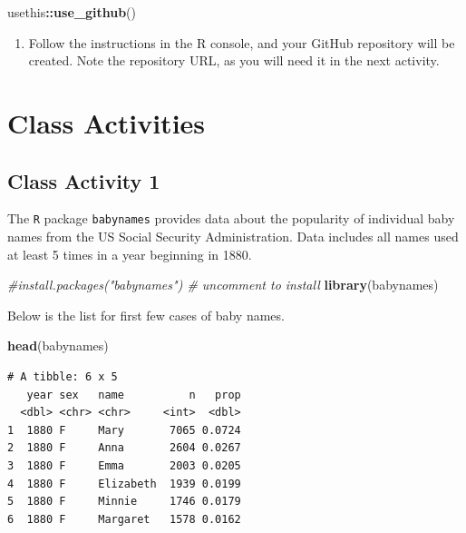 \documentclass[
]{book}
\newenvironment{Shaded}{\begin{snugshade}}{\end{snugshade}}
\newcommand{\CommentTok}[1]{\textcolor[rgb]{0.56,0.35,0.01}{\textit{#1}}}
\newcommand{\FunctionTok}[1]{\textcolor[rgb]{0.13,0.29,0.53}{\textbf{#1}}}
\newcommand{\NormalTok}[1]{#1}
\newcommand{\SpecialCharTok}[1]{\textcolor[rgb]{0.81,0.36,0.00}{\textbf{#1}}}
\providecommand{\tightlist}{%
  \setlength{\itemsep}{0pt}\setlength{\parskip}{0pt}}
\begin{document}
\begin{Shaded}
\begin{Highlighting}[]
\NormalTok{usethis}\SpecialCharTok{::}\FunctionTok{use\_github}\NormalTok{()}
\end{Highlighting}
\end{Shaded}

\begin{enumerate}
\def\labelenumi{\arabic{enumi}.}
\setcounter{enumi}{8}
\tightlist
\item
  Follow the instructions in the R console, and your GitHub repository will be created. Note the repository URL, as you will need it in the next activity.
\end{enumerate}

\hypertarget{part-class-activities}{%
\part*{Class Activities}\label{part-class-activities}}

\hypertarget{class-activity-1}{%
\chapter{Class Activity 1}\label{class-activity-1}}

The \texttt{R} package \texttt{babynames} provides data about the popularity of individual baby names from the US Social Security Administration. Data includes all names used at least 5 times in a year beginning in 1880.

\begin{Shaded}
\begin{Highlighting}[]
\CommentTok{\#install.packages("babynames")  \# uncomment to install}
\FunctionTok{library}\NormalTok{(babynames)}
\end{Highlighting}
\end{Shaded}

Below is the list for first few cases of baby names.

\begin{Shaded}
\begin{Highlighting}[]
\FunctionTok{head}\NormalTok{(babynames)}
\end{Highlighting}
\end{Shaded}

\begin{verbatim}
# A tibble: 6 x 5
   year sex   name          n   prop
  <dbl> <chr> <chr>     <int>  <dbl>
1  1880 F     Mary       7065 0.0724
2  1880 F     Anna       2604 0.0267
3  1880 F     Emma       2003 0.0205
4  1880 F     Elizabeth  1939 0.0199
5  1880 F     Minnie     1746 0.0179
6  1880 F     Margaret   1578 0.0162
\end{verbatim}
\end{document}
